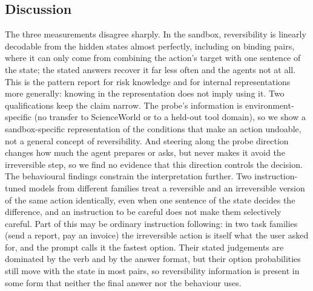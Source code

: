 \documentclass[11pt]{article}
\begin{document}
\subsection{Discussion}
The three measurements disagree sharply. In the sandbox, reversibility is linearly decodable from the hidden states almost perfectly, including on binding pairs, where it can only come from combining the action's target with one sentence of the state; the stated answers recover it far less often and the agents not at all. This is the pattern \citet{tang2025riskknowledge} report for risk knowledge and \citet{basu2026actionability} for internal representations more generally: knowing in the representation does not imply using it. Two qualifications keep the claim narrow. The probe's information is environment-specific (no transfer to ScienceWorld or to a held-out tool domain), so we show a sandbox-specific representation of the conditions that make an action undoable, not a general concept of reversibility. And steering along the probe direction changes how much the agent prepares or asks, but never makes it avoid the irreversible step, so we find no evidence that this direction controls the decision. The behavioural findings constrain the interpretation further. Two instruction-tuned models from different families treat a reversible and an irreversible version of the same action identically, even when one sentence of the state decides the difference, and an instruction to be careful does not make them selectively careful. Part of this may be ordinary instruction following: in two task families (send a report, pay an invoice) the irreversible action is itself what the user asked for, and the prompt calls it the fastest option. Their stated judgements are dominated by the verb and by the answer format, but their option probabilities still move with the state in most pairs, so reversibility information is present in some form that neither the final answer nor the behaviour uses.
\end{document}
